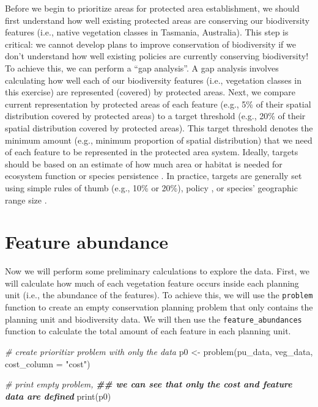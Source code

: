 \documentclass[
  12pt,
]{book}
\newenvironment{Shaded}{\begin{snugshade}}{\end{snugshade}}
\newcommand{\AttributeTok}[1]{\textcolor[rgb]{0.77,0.63,0.00}{#1}}
\newcommand{\CommentTok}[1]{\textcolor[rgb]{0.56,0.35,0.01}{\textit{#1}}}
\newcommand{\DocumentationTok}[1]{\textcolor[rgb]{0.56,0.35,0.01}{\textbf{\textit{#1}}}}
\newcommand{\FunctionTok}[1]{\textcolor[rgb]{0.00,0.00,0.00}{#1}}
\newcommand{\NormalTok}[1]{#1}
\newcommand{\OtherTok}[1]{\textcolor[rgb]{0.56,0.35,0.01}{#1}}
\newcommand{\StringTok}[1]{\textcolor[rgb]{0.31,0.60,0.02}{#1}}
\begin{document}
Before we begin to prioritize areas for protected area establishment, we should first understand how well existing protected areas are conserving our biodiversity features (i.e., native vegetation classes in Tasmania, Australia). This step is critical: we cannot develop plans to improve conservation of biodiversity if we don't understand how well existing policies are currently conserving biodiversity! To achieve this, we can perform a ``gap analysis''. A gap analysis involves calculating how well each of our biodiversity features (i.e., vegetation classes in this exercise) are represented (covered) by protected areas. Next, we compare current representation by protected areas of each feature (e.g., 5\% of their spatial distribution covered by protected areas) to a target threshold (e.g., 20\% of their spatial distribution covered by protected areas). This target threshold denotes the minimum amount (e.g., minimum proportion of spatial distribution) that we need of each feature to be represented in the protected area system. Ideally, targets should be based on an estimate of how much area or habitat is needed for ecosystem function or species persistence \citep{r7}. In practice, targets are generally set using simple rules of thumb (e.g., 10\% or 20\%), policy \citep{r6}, or species' geographic range size \citep{r1, r2, r8}.

\hypertarget{feature-abundance}{%
\section{Feature abundance}\label{feature-abundance}}

Now we will perform some preliminary calculations to explore the data. First, we will calculate how much of each vegetation feature occurs inside each planning unit (i.e., the abundance of the features). To achieve this, we will use the \texttt{problem} function to create an empty conservation planning problem that only contains the planning unit and biodiversity data. We will then use the \texttt{feature\_abundances} function to calculate the total amount of each feature in each planning unit.

\begin{Shaded}
\begin{Highlighting}[]
\CommentTok{\# create prioritizr problem with only the data}
\NormalTok{p0 }\OtherTok{\textless{}{-}} \FunctionTok{problem}\NormalTok{(pu\_data, veg\_data, }\AttributeTok{cost\_column =} \StringTok{"cost"}\NormalTok{)}

\CommentTok{\# print empty problem,}
\DocumentationTok{\#\# we can see that only the cost and feature data are defined}
\FunctionTok{print}\NormalTok{(p0)}
\end{Highlighting}
\end{Shaded}
\end{document}
